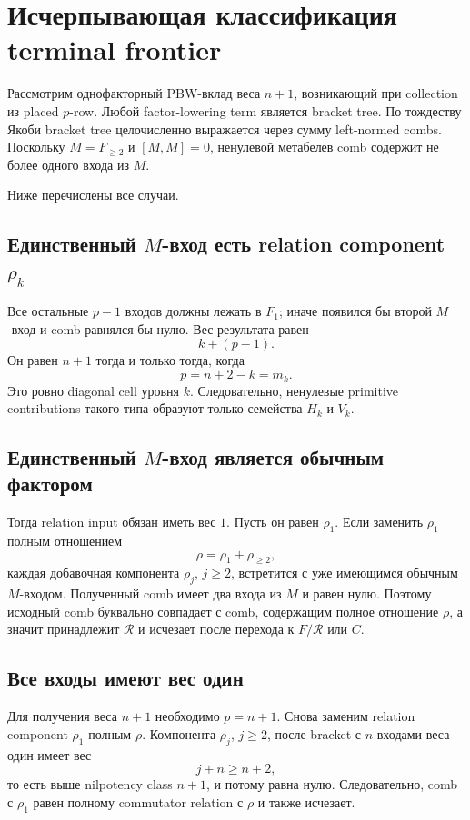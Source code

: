 \documentclass[11pt,a4paper]{article}
\theoremstyle{definition}
\theoremstyle{remark}
\newcommand{\Rel}{\mathcal R}
\begin{document}
\section{Исчерпывающая классификация terminal frontier}

Рассмотрим однофакторный PBW-вклад веса $n+1$, возникающий при collection из
placed $p$-row. Любой factor-lowering term является bracket tree. По тождеству
Якоби bracket tree целочисленно выражается через сумму left-normed combs.
Поскольку $M=F_{\ge2}$ и $[M,M]=0$, ненулевой метабелев comb содержит не
более одного входа из $M$.

Ниже перечислены все случаи.

\subsection{Единственный $M$-вход есть relation component $\rho_k$}

Все остальные $p-1$ входов должны лежать в $F_1$; иначе появился бы второй
$M$-вход и comb равнялся бы нулю. Вес результата равен
\[
 k+(p-1).
\]
Он равен $n+1$ тогда и только тогда, когда
\begin{equation}\label{eq:diagonal-condition}
 p=n+2-k=m_k.
\end{equation}
Это ровно diagonal cell уровня $k$. Следовательно, ненулевые primitive
contributions такого типа образуют только семейства $H_k$ и $V_k$.

\subsection{Единственный $M$-вход является обычным фактором}

Тогда relation input обязан иметь вес $1$. Пусть он равен $\rho_1$. Если
заменить $\rho_1$ полным отношением
\[
 \rho=\rho_1+\rho_{\ge2},
\]
каждая добавочная компонента $\rho_j$, $j\ge2$, встретится с уже имеющимся
обычным $M$-входом. Полученный comb имеет два входа из $M$ и равен нулю.
Поэтому исходный comb буквально совпадает с comb, содержащим полное
отношение $\rho$, а значит принадлежит $\Rel$ и исчезает после перехода к
$F/\Rel$ или $C$.

\subsection{Все входы имеют вес один}

Для получения веса $n+1$ необходимо $p=n+1$. Снова заменим relation component
$\rho_1$ полным $\rho$. Компонента $\rho_j$, $j\ge2$, после bracket с $n$
входами веса один имеет вес
\[
 j+n\ge n+2,
\]
то есть выше nilpotency class $n+1$, и потому равна нулю. Следовательно,
comb с $\rho_1$ равен полному commutator relation с $\rho$ и также исчезает.
\end{document}
